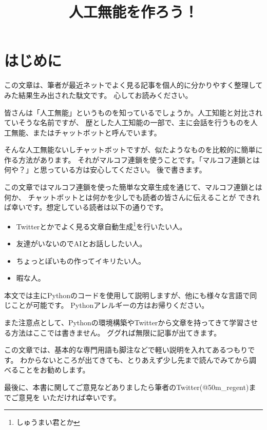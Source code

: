 \documentclass{jsarticle}
\title{人工無能を作ろう！}
\author{}
\date{}
\begin{document}
    \maketitle

    \section*{はじめに}
        この文章は、筆者が最近ネットでよく見る記事を個人的に分かりやすく整理してみた結果生み出された駄文です。
        心してお読みください。

        皆さんは「人工無能」というものを知っているでしょうか。人工知能と対比されていそうな名前ですが、
        歴とした人工知能の一部で、主に会話を行うものを人工無能、またはチャットボットと呼んでいます。

        そんな人工無能ないしチャットボットですが、似たようなものを比較的に簡単に作る方法があります。
        それがマルコフ連鎖を使うことです。「マルコフ連鎖とは何や？」と思っている方は安心してください。
        後で書きます。

        この文章ではマルコフ連鎖を使った簡単な文章生成を通じて、マルコフ連鎖とは何か、
        チャットボットとは何かを少しでも読者の皆さんに伝えることが
        できれば幸いです。想定している読者は以下の通りです。

        \begin{itemize}
            \item Twitterとかでよく見る文章自動生成\footnote{しゅうまい君とか}を行いたい人。
            \item 友達がいないのでAIとお話ししたい人。
            \item ちょっとぽいもの作ってイキリたい人。
            \item 暇な人。
        \end{itemize}
        
        本文では主にPythonのコードを使用して説明しますが、他にも様々な言語で同じことが可能です。
        Pythonアレルギーの方はお帰りください。

        また注意点として、Pythonの環境構築やTwitterから文章を持ってきて学習させる方法はここでは書きません。
        ググれば無限に記事が出てきます。

        この文章では、基本的な専門用語も脚注などで軽い説明を入れてあるつもりです。
        わからないところが出てきても、とりあえず少し先まで読んでみてから調べることをお勧めします。

        最後に、本書に関してご意見などありましたら筆者のTwitter(@50m\_regent)までご意見を
        いただければ幸いです。
\end{document}
